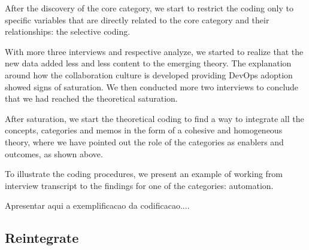 After the discovery of the core category, we start to restrict the coding only
to specific variables that are directly related to the core category and their
relationships: the selective coding.

With more three interviews and respective analyze, we started to realize that
the new data added less and less content to the emerging theory. The
explanation around how the collaboration culture is developed providing
DevOps adoption showed signs of saturation. We then conducted more two
interviews to conclude that we had reached the theoretical saturation.

After saturation, we start the theoretical coding to find a way to integrate
all the concepts, categories and memos in the form of a cohesive and
homogeneous theory, where we have pointed out the role of the categories as
enablers and outcomes, as shown above.

To illustrate the coding procedures, we present an example of working from
interview transcript to the findings for one of the categories: automation.

Apresentar aqui a exemplificacao da codificacao....

\subsection{Reintegrate }

